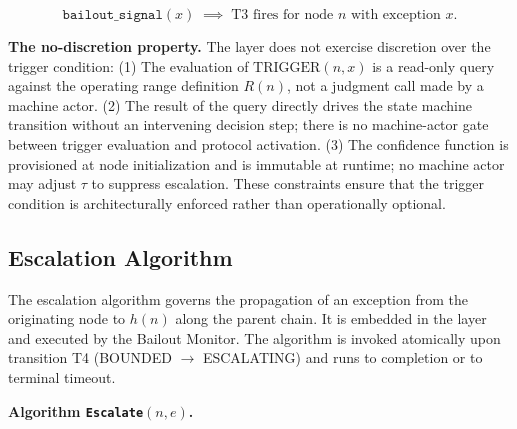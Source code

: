 \begin{equation}
\texttt{bailout\_signal}(x) \;\implies\; \text{T3 fires for node } n \text{ with exception } x. \tag{TC-secondary}
\end{equation}

\bigskip
\noindent\textbf{The no-discretion property.} The \bounds{} layer does not exercise discretion over the trigger condition: (1) The evaluation of $\text{TRIGGER}(n, x)$ is a read-only query against the operating range definition $R(n)$, not a judgment call made by a machine actor. (2) The result of the query directly drives the state machine transition without an intervening decision step; there is no machine-actor gate between trigger evaluation and protocol activation. (3) The confidence function is provisioned at node initialization and is immutable at runtime; no machine actor may adjust $\tau$ to suppress escalation. These constraints ensure that the trigger condition is architecturally enforced rather than operationally optional.

\subsection{Escalation Algorithm}\label{sec:escalation-algorithm}

The escalation algorithm governs the propagation of an exception from the originating node to $h(n)$ along the parent chain. It is embedded in the \fact{} layer and executed by the Bailout Monitor. The algorithm is invoked atomically upon transition T4 (BOUNDED $\rightarrow$ ESCALATING) and runs to completion or to terminal timeout.

\bigskip
\noindent\textbf{Algorithm \texttt{Escalate}$(n, e)$.}


